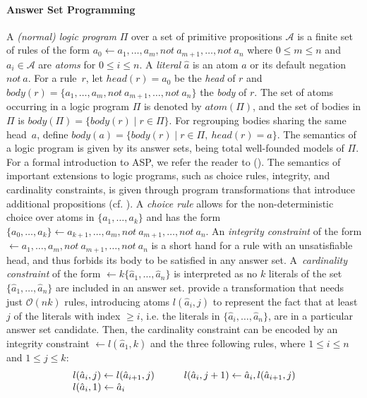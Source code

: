 \documentclass[letterpaper]{article}
\newcommand{\alphabet}{\mathcal{A}}
\newcommand{\atom}[1]{atom(#1)}
\newcommand{\head}[1]{head(#1)}
\newcommand{\body}[1]{body(#1)}
\newcommand{\dneg}{not\ }
\newcommand{\citeay}[1]{\citeauthor{#1} \citeyear{#1}}
\newcommand{\citeap}[1]{\citeauthor{#1} (\citeyear{#1})}
\begin{document}
\paragraph{Answer Set Programming}
A \emph{(normal) logic program} $\Pi$ over a set of primitive propositions $\alphabet$ is a finite set of rules of the form
$
a_0 \leftarrow a_1 , \dots , a_m, \dneg a_{m+1} , \dots , \dneg a_n 
$
where $0 \leq m \leq n$ and $a_i \in \alphabet$ are \emph{atoms} for $0 \leq i \leq n$. A \emph{literal} $\hat{a}$ is an atom $a$ or its default negation $\dneg a$.
For a rule~$r$, let $\head{r} = a_0$ be the \emph{head} of $r$ and $\body{r} = \{a_1 , \dots , a_m, \dneg a_{m+1} , \dots , \dneg a_n \}$ the \emph{body} of $r$. The set of atoms occurring in a logic program $\Pi$ is denoted by $\atom{\Pi}$, and the set of bodies in $\Pi$ is $\body{\Pi} = \{ \body{r} \mid r \in \Pi \}$. For regrouping bodies sharing the same head~$a$, define $\body{a} = \{ \body{r} \mid r \in \Pi,\ \head{r} = a \}$.
The semantics of a logic program is given by its answer sets, being total well-founded models of $\Pi$. For a formal introduction to ASP, we refer the reader to \citeap{baral03}.
The semantics of important extensions to logic programs, such as choice rules, integrity, and cardinality constraints, is given through program transformations that introduce additional propositions (cf. \citeay{siniso02a}).
A \emph{choice rule} allows for the non-deterministic choice over atoms in $\{a_1, \dots, a_k\}$ and has the form
$
\{a_0, \dots, a_k\} \leftarrow a_{k+1} , \dots , a_m, \dneg a_{m+1} , \dots , \dneg a_n.
$
An \emph{integrity constraint} of the form
$
\leftarrow a_1 , \dots , a_m, \dneg a_{m+1} , \dots , \dneg a_n 
$
is a short hand for a rule with an unsatisfiable head, and thus forbids its body to be satisfied in any answer set.
A~\emph{cardinality constraint} of the form
$
\leftarrow k \{\hat{a}_1 , \dots, \hat{a}_n\}
$
is interpreted as no $k$ literals of the set $\{\hat{a}_1 , \dots, \hat{a}_n\}$ are included in an answer set.
\citeauthor{siniso02a} provide a transformation that needs just $\mathcal{O}(nk)$ rules, introducing atoms $l(\hat{a}_i,j)$ to represent the fact that at least $j$ of the literals with index $\geq i$, i.e. the literals in $\{ \hat{a}_i, \dots, \hat{a}_n \}$,
 are in a particular answer set candidate. Then, the cardinality constraint can be encoded by an integrity constraint $\leftarrow l(\hat{a}_1,k)$ and the three following rules, where $1 \leq i \leq n$ and $1 \leq j \leq k$:
\[
\begin{array}{l@{\qquad\quad}r}
l(\hat{a}_i,j) \leftarrow l(\hat{a}_{i+1},j) & l(\hat{a}_i,j+1) \leftarrow \hat{a}_i, l(\hat{a}_{i+1},j)\\
l(\hat{a}_i,1) \leftarrow \hat{a}_i &
\end{array}
\]
\end{document}
